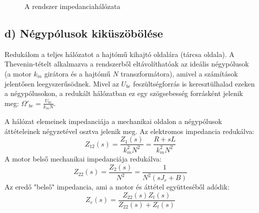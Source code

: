 \begin{figure}[H]
{
    }
    \caption{A rendszer impedanciahálózata}
\end{figure}

\subsection{d) Négypólusok kiküszöbölése}
Redukálom a teljes hálózatot a hajtómű kihajtó oldalára (tárcsa oldala). A Thevenin-tételt alkalmazva a rendszerből eltávolíthatóak az ideális négypólusok (a motor $k_m$ girátora és a hajtómű $N$ transzformátora), amivel a számítások jelentősen leegyszerűsödnek. Mivel az $U_{be}$ feszültségforrás is keresztülhalad ezeken a négypólusokon, a redukált hálózatban ez egy szögsebesség forrásként jelenik meg: $\Omega'_{be} = \frac{U_{be}}{k_m N}$.

A hálózat elemeinek impedanciája a mechanikai oldalon a négypólusok áttételeinek négyzetével osztva jelenik meg.
Az elektromos impedancia redukálva:
\begin{equation}
    Z_{12}(s) = \frac{Z_1(s)}{k_m^2 N^2} = \frac{R + s L}{k_m^2 N^2}
\end{equation}
A motor belső mechanikai impedanciája redukálva:
\begin{equation}
    Z_{22}(s) = \frac{Z_2(s)}{N^2} = \frac{1}{N^2 (s J_r + B)}
\end{equation}
Az eredő "belső" impedancia, ami a motor és áttétel együtteséből adódik:
\begin{equation}
    Z_e(s) = \frac{Z_{22}(s) Z_t(s)}{Z_{22}(s) + Z_t(s)}
\end{equation}


